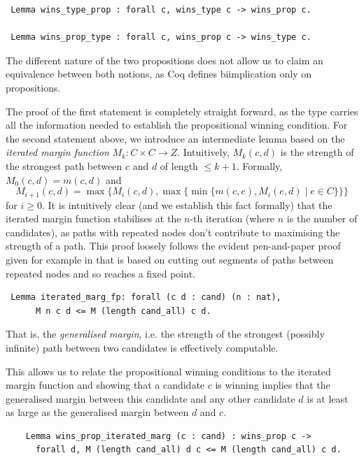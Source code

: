 \begin{verbatim}
 Lemma wins_type_prop : forall c, wins_type c -> wins_prop c.

 Lemma wins_prop_type : forall c, wins_prop c -> wins_type c.
\end{verbatim}

\noindent
The different nature of the two propositions does not allow
us to claim an equivalence between both notions, as Coq defines
biimplication only on propositions.

The proof of the first statement is completely straight forward, as
the type carries all the information needed to establish the
propositional winning condition. For the second statement above, we
introduce an intermediate lemma based on the \emph{iterated margin
function}
$M_k: C \times C \to Z$. Intuitively, $M_k (c, d)$ is the
strength of the strongest path between $c$ and $d$ of length $\leq
k+1$. Formally,
$M_0 (c, d) = m(c, d)$ and
\[ M_{i+1}(c, d) = \max \lbrace M_i(c, d), \max \lbrace  \min
\lbrace m(c, e), M_i(e, d) \mid e \in C \rbrace \rbrace \rbrace
\] for $i \geq 0$.
%
It is intuitively clear (and we establish this fact formally) that
the iterated margin function stabilises at the $n$-th iteration
(where $n$ is the number of candidates), as paths with repeated
nodes don't contribute to maximising the strength of a path. This
proof loosely follows the evident pen-and-paper proof given for
example in
\cite{Carre:1971:ANR} that is based on cutting out segments of paths
between repeated nodes and so reaches a fixed point.

\begin{verbatim}
 Lemma iterated_marg_fp: forall (c d : cand) (n : nat),
      M n c d <= M (length cand_all) c d.
\end{verbatim}

\noindent
That is, the \emph{generalised margin}, i.e. the strength of the strongest (possibly infinite) path
between two candidates is
effectively computable.

This allows us to relate the propositional winning conditions to the
iterated margin function and showing that a candidate $c$ is winning
implies that the generalised margin between this candidate and any
other candidate $d$ is at least as large as the generalised margin between $d$
and $c$.

\begin{verbatim}
    Lemma wins_prop_iterated_marg (c : cand) : wins_prop c ->
      forall d, M (length cand_all) d c <= M (length cand_all) c d.
\end{verbatim}

